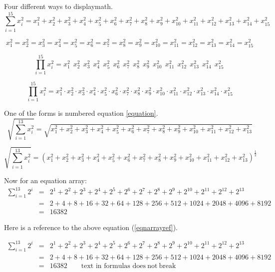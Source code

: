 \documentclass[12pt,a4paper]{article}
\theoremstyle{clearprint}
\begin{document}
\noindent 
Four different ways to displaymath.
\setcounter{equation}{99}
\begin{equation}\label{equation}
\sum_{i=1}^{15} x_i^2 = x_1^2 + x_2^2 + x_3^2 + x_4^2 + x_5^2 + x_6^2 + x_7^2 + x_8^2 + x_9^2 + x_{10}^2 + x_{11}^2 + x_{12}^2 + x_{13}^2 + x_{14}^2 + x_{15}^2 
\end{equation}

\noindent 
\begin{displaymath}
x_1^2 = x_2^2 = x_3^2 = x_4^2 = x_5^2 = x_6^2 = x_7^2 = x_8^2 = x_9^2 = x_{10}^2 = x_{11}^2 = x_{12}^2 = x_{13}^2 = x_{14}^2 = x_{15}^2 
\end{displaymath}

\noindent 
\[
\prod_{i=1}^{15} x_i^2 = x_1^2\ \ x_2^2\ \ x_3^2\ \ x_4^2\ \ x_5^2\ \ x_6^2\ \ x_7^2\ \ x_8^2\ \ x_9^2\ \ x_{10}^2\ \ x_{11}^2\ \ x_{12}^2\ \ x_{13}^2\ \ x_{14}^2\ \ x_{15}^2\ 
\]

\noindent 
$$
\prod_{i=1}^{15} x_i^2 = x_1^2 \cdot x_2^2 \cdot x_3^2 \cdot x_4^2 \cdot x_5^2 \cdot x_6^2 \cdot x_7^2 \cdot x_8^2 \cdot x_9^2 \cdot x_{10}^2 \cdot x_{11}^2 \cdot x_{12}^2 \cdot x_{13}^2 \cdot x_{14}^2 \cdot x_{15}^2 
$$

\noindent 
One of the forms is numbered equation \ref{equation}.
\[
\sqrt{\sum_{i=1}^{13} x_i^2} = \sqrt{x_1^2 + x_2^2 + x_3^2 + x_4^2 + x_5^2 + x_6^2 + x_7^2 + x_8^2 + x_9^2 + x_{10}^2+ x_{11}^2 + x_{12}^2 + x_{13}^2 }
\]

\noindent 
\[
\sqrt{\sum_{i=1}^{13} x_i^2} = \left(x_1^2 + x_2^2 + x_3^2 + x_4^2 + x_5^2 + x_6^2 + x_7^2 + x_8^2 + x_9^2 + x_{10}^2+ x_{11}^2 + x_{12}^2 + x_{13}^2 \right)^{\frac{1}{2}}
\]

\noindent 
Now for an equation array:
\begin{eqnarray}\label{eqnarrayref}
\sum_{i=1}^{13} 2^i &=& 2^1 + 2^2 + 2^3 + 2^4 + 2^5 + 2^6 + 2^7 + 2^8 + 2^9 + 2^{10} + 2^{11} + 2^{12} + 2^{13}\nonumber\\
&=&2 + 4 + 8 + 16 + 32 + 64 + 128 + 256 + 512 + 1024 + 2048 + 4096 + 8192 \nonumber\\
&=&16382 
\end{eqnarray}

Here is a reference to the above equation (\ref{eqnarrayref}). 

\noindent 
\begin{eqnarray*}
\sum_{i=1}^{13} 2^i &=& 2^1 + 2^2 + 2^3 + 2^4 + 2^5 + 2^6 + 2^7 + 2^8 + 2^9 + 2^{10} + 2^{11} + 2^{12} + 2^{13}\\
&=&2 + 4 + 8 + 16 + 32 + 64 + 128 + 256 + 512 + 1024 + 2048 + 4096 + 8192\\
&=&16382 \qquad\mbox{text in formulas~} \mathrm{does~not~break}
\end{eqnarray*}
\end{document}
